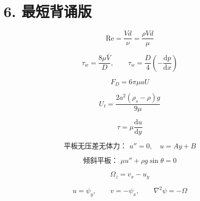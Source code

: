 \documentclass[12pt,a4paper]{ctexart}
\newcommand{\dd}{\mathrm d}
\newcommand{\Rey}{\mathrm{Re}}
\begin{document}
\section*{6. 最短背诵版}

\[
\boxed{
\Rey=\frac{Vd}{\nu}=\frac{\rho Vd}{\mu}
}
\]

\[
\boxed{
\tau_w=\frac{8\mu \bar V}{D},
\qquad
\tau_w=\frac{D}{4}\left(-\frac{\dd p}{\dd x}\right)
}
\]

\[
\boxed{
F_D=6\pi\mu aU
}
\]

\[
\boxed{
U_t=\frac{2a^2(\rho_s-\rho)g}{9\mu}
}
\]

\[
\boxed{
\tau=\mu\frac{\dd u}{\dd y}
}
\]

\[
\boxed{
\text{平板无压差无体力： }u''=0,\quad u=Ay+B
}
\]

\[
\boxed{
\text{倾斜平板： }\mu u''+\rho g\sin\theta=0
}
\]

\[
\boxed{
\Omega_z=v_x-u_y
}
\]

\[
\boxed{
u=\psi_y,\qquad v=-\psi_x,\qquad \nabla^2\psi=-\Omega
}
\]
\end{document}

